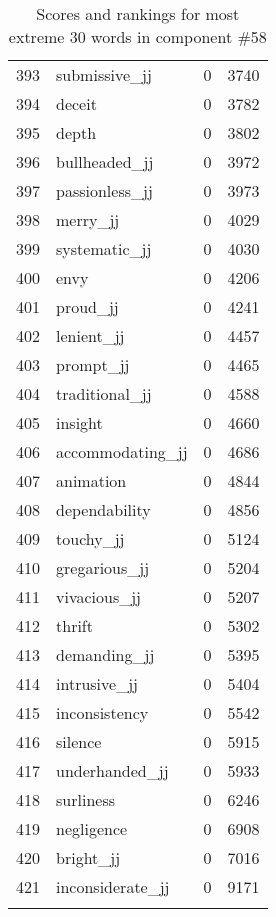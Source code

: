 \begin{longtable}[!htbp]{| rlr@{.}l |}
    393 & submissive\_jj & 0 & 3740 \\
    394 & deceit & 0 & 3782 \\
    395 & depth & 0 & 3802 \\
    396 & bullheaded\_jj & 0 & 3972 \\
    397 & passionless\_jj & 0 & 3973 \\
    398 & merry\_jj & 0 & 4029 \\
    399 & systematic\_jj & 0 & 4030 \\
    400 & envy & 0 & 4206 \\
    401 & proud\_jj & 0 & 4241 \\
    402 & lenient\_jj & 0 & 4457 \\
    403 & prompt\_jj & 0 & 4465 \\
    404 & traditional\_jj & 0 & 4588 \\
    405 & insight & 0 & 4660 \\
    406 & accommodating\_jj & 0 & 4686 \\
    407 & animation & 0 & 4844 \\
    408 & dependability & 0 & 4856 \\
    409 & touchy\_jj & 0 & 5124 \\
    410 & gregarious\_jj & 0 & 5204 \\
    411 & vivacious\_jj & 0 & 5207 \\
    412 & thrift & 0 & 5302 \\
    413 & demanding\_jj & 0 & 5395 \\
    414 & intrusive\_jj & 0 & 5404 \\
    415 & inconsistency & 0 & 5542 \\
    416 & silence & 0 & 5915 \\
    417 & underhanded\_jj & 0 & 5933 \\
    418 & surliness & 0 & 6246 \\
    419 & negligence & 0 & 6908 \\
    420 & bright\_jj & 0 & 7016 \\
    421 & inconsiderate\_jj & 0 & 9171 \\
    \hline
    \caption{Scores and rankings for most extreme 30 words in component \#58} \\
\end{longtable}
